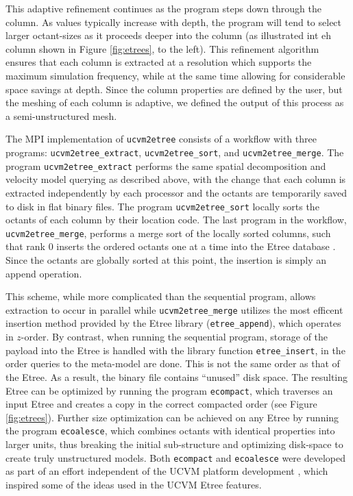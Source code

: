 This adaptive refinement continues as the program steps down through the column. As \vs{} values typically increase with depth, the program will tend to select larger octant-sizes as it proceeds deeper into the column (as illustrated int eh column shown in Figure \ref{fig:etrees}, to the left). This refinement algorithm ensures that each column is extracted at a resolution which supports the maximum simulation frequency, while at the same time allowing for considerable space savings at depth. Since the column properties are defined by the user, but the meshing of each column is adaptive, we defined the output of this process as a semi-unstructured mesh.

The MPI implementation of \texttt{ucvm2etree} consists of a workflow with three programs: \texttt{ucvm2etree\_extract}, \texttt{ucvm2etree\_sort}, and \texttt{ucvm2etree\_merge}. The program \texttt{ucvm2etree\_extract} performs the same spatial decomposition and velocity model querying as described above, with the change that each column is extracted independently by each processor and the octants are temporarily saved to disk in flat binary files. The program \texttt{ucvm2etree\_sort} locally sorts the octants of each column by their location code. The last program in the workflow, \texttt{ucvm2etree\_merge}, performs a merge sort of the locally sorted columns, such that rank 0 inserts the ordered octants one at a time into the Etree database \citep[in its natural $z$-order; see][]{Tu_2003_Tech}. Since the octants are globally sorted at this point, the insertion is simply an append operation. 

This scheme, while more complicated than the sequential program, allows extraction to occur in parallel while \texttt{ucvm2etree\_merge} utilizes the most efficent insertion method provided by the Etree library (\texttt{etree\_append}), which operates in $z$-order. By contrast, when running the sequential program, storage of the payload into the Etree is handled with the library function \texttt{etree\_insert}, in the order queries to the meta-model are done. This is not the same order as that of the Etree. As a result, the binary file contains ``unused'' disk space. The resulting Etree can be optimized by running the program \texttt{ecompact}, which traverses an input Etree and creates a copy in the correct compacted order (see Figure \ref{fig:etrees}). Further size optimization can be achieved on any Etree by running the program \texttt{ecoalesce}, which combines octants with identical properties into larger units, thus breaking the initial sub-structure and optimizing disk-space to create truly unstructured models. Both \texttt{ecompact} and \texttt{ecoalesce} were developed as part of an effort independent of the UCVM platform development \citep{Schlosser_2008_Proc}, which inspired some of the ideas used in the UCVM Etree features.

